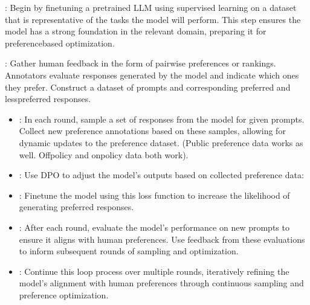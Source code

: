 \documentclass[letterpaper,11pt,english]{sphinxmanual}
\begin{document}
\sphinxAtStartPar
{}

\sphinxAtStartPar
{}: Begin by
fine\sphinxhyphen{}tuning a pre\sphinxhyphen{}trained LLM using supervised learning on a dataset
that is representative of the tasks the model will perform. This step
ensures the model has a strong foundation in the relevant domain,
preparing it for preference\sphinxhyphen{}based optimization.

\sphinxAtStartPar
{}: Gather human feedback in the form of
pairwise preferences or rankings. Annotators evaluate responses
generated by the model and indicate which ones they prefer. Construct a
dataset of prompts and corresponding preferred and less\sphinxhyphen{}preferred
responses.

\sphinxAtStartPar
{}
\begin{itemize}
\item {} 
\sphinxAtStartPar
{}: In each round, sample a set of responses
from the model for given prompts. Collect new preference annotations
based on these samples, allowing for dynamic updates to the preference
dataset. (Public preference data works as well. Off\sphinxhyphen{}policy and
on\sphinxhyphen{}policy data both work).

\item {} 
\sphinxAtStartPar
{}: Use DPO to adjust the model’s outputs
based on collected preference data:

\item {} 
\sphinxAtStartPar
{}: Fine\sphinxhyphen{}tune the model using this loss function to
increase the likelihood of generating preferred responses.

\end{itemize}

\sphinxAtStartPar
{}
\begin{itemize}
\item {} 
\sphinxAtStartPar
{}: After each round, evaluate the model’s
performance on new prompts to ensure it aligns with human preferences.
Use feedback from these evaluations to inform subsequent rounds of
sampling and optimization.

\item {} 
\sphinxAtStartPar
{}: Continue this loop process over multiple
rounds, iteratively refining the model’s alignment with human
preferences through continuous sampling and preference optimization.

\end{itemize}
\end{document}
